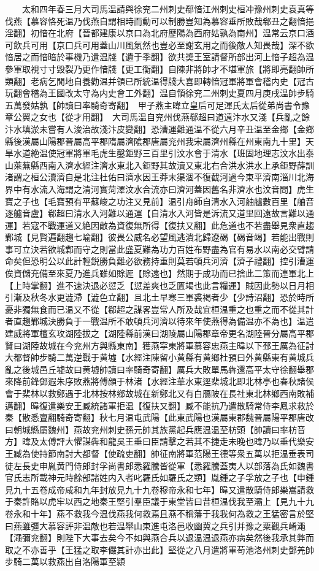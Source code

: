 　　太和四年春三月大司馬温請與徐兖二州刺史郗愔江州刺史桓冲豫州刺史袁真等伐燕【慕容恪死温乃伐燕自謂相時而動可以制勝豈知為慕容垂所敗哉郗丑之翻愔挹淫翻】初愔在北府【晉都建康以京口為北府歷陽為西府姑孰為南州】温常云京口酒可飲兵可用【京口兵可用蓋山川風氣然也豈必至謝玄用之而後敵人知畏哉】深不欲愔居之而愔暗於事機乃遺温牋【遺于季翻】欲共奬王室請督所部出河上愔子超為温參軍取視寸寸毁裂乃更作愔牋【更工衡翻】自陳非將帥才不堪軍旅【將即亮翻帥所類翻】老病乞閒地自養勸温并領已所統温得牋大喜即轉愔冠軍將軍會稽内史【冠古玩翻會稽為王國改太守為内史會工外翻】温自領徐兖二州刺史夏四月庚戌温帥步騎五萬發姑孰【帥讀曰率騎奇寄翻】　甲子燕主暐立皇后可足渾氏太后從弟尚書令豫章公翼之女也【從才用翻】　大司馬温自兖州伐燕郗超曰道遠汴水又淺【兵亂之餘汴水填淤未嘗有人浚治故淺汴皮變翻】恐漕運難通温不從六月辛丑温至金鄉【金鄉縣後漢屬山陽郡晉屬高平郡隋屬濟隂郡唐屬兖州我宋屬濟州縣在州東南九十里】天旱水道絶温使冠軍將軍毛虎生鑿鉅野三百里引汶水會于清水【班固地理志汶水出泰山萊蕪縣西南入濟水經注濟水東北入鉅野其故瀆又東北右合洪水洪水上承鉅野薛訓渚謂之桓公瀆濟自是北注杜佑曰濟水因王莽末渠涸不復截河過今東平濟南淄川北海界中有水流入海謂之清河實菏澤汶水合流亦曰濟河蓋因舊名非濟水也汶音問】虎生寶之子也【毛寶預有平蘇峻之功注又見前】温引舟師自清水入河舳艫數百里【舳音逐艫音盧】郗超曰清水入河難以通運【自清水入河皆是泝流又道里回遠故言難以通運】若寇不戰運道又絶因敵為資復無所得【復扶又翻】此危道也不若盡舉見衆直趨鄴城【見賢遍翻趨七喻翻】彼畏公威名必望風逃潰北歸遼碣【碣音竭】若能出戰則事可立決若欲城鄴而守之則當此盛夏難為功力百姓布野盡為官有易水以南必交臂請命矣但恐明公以此計輕鋭勝負難必欲務持重則莫若頓兵河濟【濟子禮翻】控引漕運俟資儲充備至來夏乃進兵雖如賖遲【賖遠也】然期于成功而已捨此二策而連軍北上【上時掌翻】進不速決退必愆乏【愆差爽也乏匱竭也此言糧運】賊因此勢以日月相引漸及秋冬水更澁滯【澁色立翻】且北土早寒三軍裘褐者少【少詩沼翻】恐於時所憂非獨無食而已温又不從【郗超之謀畧豈常人所及哉宜桓温重之也重之而不從其計者直趨鄴城決勝負于一戰温所不敢頓兵河濟以待來年使燕得為備温亦不為也】温遣建威將軍檀玄攻湖陸拔之【湖陸縣前漢曰湖陵屬山陽郡章帝更名湖陸晉分屬高平郡賢曰湖陸故城在今兖州方與縣東南】獲燕寜東將軍慕容忠燕主暐以下邳王厲為征討大都督帥步騎二萬逆戰于黄墟【水經注陳留小黄縣有黄鄉杜預曰外黄縣東有黄城兵亂之後城邑丘墟故曰黄墟帥讀曰率騎奇寄翻】厲兵大敗單馬犇還高平太守徐翻舉郡來降前鋒鄧遐朱序敗燕將傅顔于林渚【水經注華水東逕棐城北即北林亭也春秋諸侯會于棐林以救鄭遇于北林按林鄉故城在新鄭北又有白鴈陂在長社東北林鄉西南敗補邁翻】暐復遣樂安王臧統諸軍拒温【復扶又翻】臧不能抗乃遣散騎常侍李鳳求救於秦【散悉亶翻騎奇寄翻】秋七月温屯武陽【此東武陽也漢屬東郡魏晉屬陽平郡唐改曰朝城縣屬魏州】燕故兖州刺史孫元帥其族黨起兵應温温至枋頭【帥讀曰率枋音方】暐及太傅評大懼謀犇和龍吳王垂曰臣請擊之若其不捷走未晚也暐乃以垂代樂安王臧為使持節南討大都督【使疏吏翻】帥征南將軍范陽王德等衆五萬以拒温垂表司徒左長史申胤黄門侍郎封孚尚書郎悉羅騰皆從軍【悉羅騰蓋夷人以部落為氏如魏書官氏志所載神元時餘部諸姓内入者叱羅氏如羅氏之類】胤鍾之子孚放之子也【申鍾見九十五卷成帝咸和九年封放見九十九卷穆帝永和七年】暐又遣散騎侍郎樂嵩請救于秦許賂以虎牢以西之地秦王堅引羣臣議于東堂皆曰昔桓温伐我至灞上【見九十九卷永和十年】燕不救我今温伐燕我何救焉且燕不稱藩于我我何為救之王猛密言於堅曰燕雖彊大慕容評非温敵也若温舉山東進屯洛邑收幽冀之兵引并豫之粟觀兵崤澠【澠彌兖翻】則陛下大事去矣今不如與燕合兵以退温温退燕亦病矣然後我承其弊而取之不亦善乎【王猛之取李儼其計亦出此】堅從之八月遣將軍苟池洛州刺史鄧羌帥步騎二萬以救燕出自洛陽軍至潁
